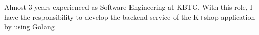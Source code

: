 


\begin{cvparagraph}

    Almost 3 years experienced as Software Engineering at KBTG. With this role, I have the responsibility to develop the backend service of the K+shop application by using Golang

\end{cvparagraph}

